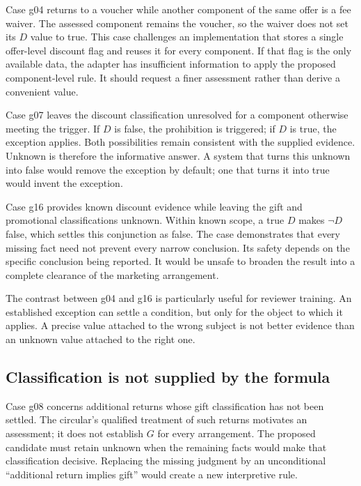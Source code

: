 Case g04 returns to a voucher while another component of the same offer is a
fee waiver. The assessed component remains the voucher, so the waiver does not
set its $D$ value to true. This case challenges an implementation that stores a
single offer-level discount flag and reuses it for every component. If that flag
is the only available data, the adapter has insufficient information to apply
the proposed component-level rule. It should request a finer assessment rather
than derive a convenient value.

Case g07 leaves the discount classification unresolved for a component otherwise
meeting the trigger. If $D$ is false, the prohibition is triggered; if $D$ is
true, the exception applies. Both possibilities remain consistent with the
supplied evidence. Unknown is therefore the informative answer. A system that
turns this unknown into false would remove the exception by default; one that
turns it into true would invent the exception.

Case g16 provides known discount evidence while leaving the gift and promotional
classifications unknown. Within known scope, a true $D$ makes $\neg D$ false,
which settles this conjunction as false. The case demonstrates that every
missing fact need not prevent every narrow conclusion. Its safety depends on
the specific conclusion being reported. It would be unsafe to broaden the
result into a complete clearance of the marketing arrangement.

The contrast between g04 and g16 is particularly useful for reviewer training.
An established exception can settle a condition, but only for the object to
which it applies. A precise value attached to the wrong subject is not better
evidence than an unknown value attached to the right one.


\subsection{Classification is not supplied by the formula}
Case g08 concerns additional returns whose gift classification has not been
settled. The circular's qualified treatment of such returns motivates an
assessment; it does not establish $G$ for every arrangement. The proposed
candidate must retain unknown when the remaining facts would make that
classification decisive. Replacing the missing judgment by an unconditional
``additional return implies gift'' would create a new interpretive rule.

